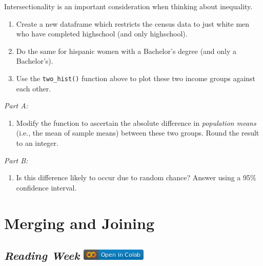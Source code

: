 \documentclass[
  letterpaper,
  DIV=11,
  numbers=noendperiod]{scrreprt}
\providecommand{\tightlist}{%
  \setlength{\itemsep}{0pt}\setlength{\parskip}{0pt}}\usepackage{longtable,booktabs,array}
\begin{document}
Intersectionality is an important consideration when thinking about
inequality.

\begin{enumerate}
\def\labelenumi{\arabic{enumi}.}
\tightlist
\item
  Create a new dataframe which restricts the census data to just white
  men who have completed highschool (and only highschool).
\item
  Do the same for hispanic women with a Bachelor's degree (and only a
  Bachelor's).
\item
  Use the \texttt{two\_hist()} function above to plot these two income
  groups against each other.
\end{enumerate}

\emph{Part A:}

\begin{enumerate}
\def\labelenumi{\arabic{enumi}.}
\setcounter{enumi}{3}
\tightlist
\item
  Modify the function to ascertain the absolute difference in
  \emph{population means} (i.e., the mean of sample means) between these
  two groups. Round the result to an integer.
\end{enumerate}

\emph{Part B:}

\begin{enumerate}
\def\labelenumi{\arabic{enumi}.}
\setcounter{enumi}{4}
\tightlist
\item
  Is this difference likely to occur due to random chance? Answer using
  a 95\% confidence interval.
\end{enumerate}


\hypertarget{merging-and-joining}{%
\chapter{Merging and Joining}\label{merging-and-joining}}

\hypertarget{reading-week-open-in-colab}{%
\section[\emph{Reading Week} ]{\texorpdfstring{\emph{Reading Week}
\href{https://colab.research.google.com/github/oballinger/QM2/blob/main/notebooks/RW.\%20Merging\%20and\%20Joining.ipynb}{\protect\includegraphics{index_files/mediabag/colab-badge.png}}}{Reading Week Open In Colab}}\label{reading-week-open-in-colab}}
\end{document}
